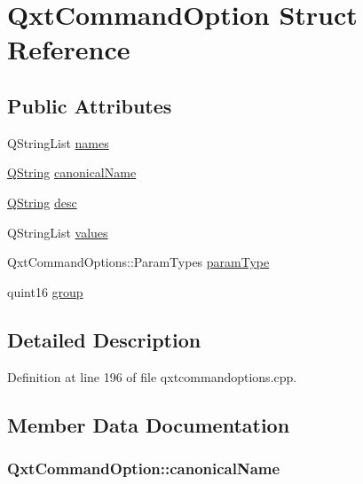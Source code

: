 \hypertarget{struct_qxt_command_option}{\section{Qxt\-Command\-Option Struct Reference}
\label{struct_qxt_command_option}
}
\subsection*{Public Attributes}
\begin{DoxyCompactItemize}
\item 
Q\-String\-List \hyperlink{struct_qxt_command_option_afe825653fae1009fefcb8ec59fbac342}{names}
\item 
\hyperlink{group___u_a_v_objects_plugin_gab9d252f49c333c94a72f97ce3105a32d}{Q\-String} \hyperlink{struct_qxt_command_option_a31589f172427dcb30ea3e5a38aa210a3}{canonical\-Name}
\item 
\hyperlink{group___u_a_v_objects_plugin_gab9d252f49c333c94a72f97ce3105a32d}{Q\-String} \hyperlink{struct_qxt_command_option_ad4055f9344df08abd7512dd017300291}{desc}
\item 
Q\-String\-List \hyperlink{struct_qxt_command_option_afb945ec7fd98e736458c99590ea4efb4}{values}
\item 
Qxt\-Command\-Options\-::\-Param\-Types \hyperlink{struct_qxt_command_option_a6138565d88b6fc850853dc4fc760f37b}{param\-Type}
\item 
quint16 \hyperlink{struct_qxt_command_option_ae4177f7802b5d07478bbd54d690482ac}{group}
\end{DoxyCompactItemize}


\subsection{Detailed Description}


Definition at line 196 of file qxtcommandoptions.\-cpp.



\subsection{Member Data Documentation}
\hypertarget{struct_qxt_command_option_a31589f172427dcb30ea3e5a38aa210a3}{
\subsubsection[{canonical\-Name}]{ Qxt\-Command\-Option\-::canonical\-Name}}\label{struct_qxt_command_option_a31589f172427dcb30ea3e5a38aa210a3}


